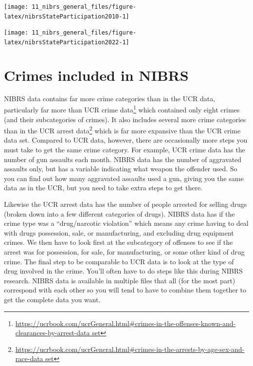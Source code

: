 \documentclass[
]{krantz}
\let\origfigure\figure
\let\endorigfigure\endfigure
\renewenvironment{figure}[1][2] {
    \expandafter\origfigure\expandafter[H]
} {
    \endorigfigure
}
\renewcommand{\href}[2]{#2\footnote{\url{#1}}}
\begin{document}
\begin{figure}

{\centering \texttt{[image: 11\_nibrs\_general\_files/figure-latex/nibrsStateParticipation2010-1]} 

}

\caption{The percent of each state's population that is covered by police agencies reporting at least one month of data to NIBRS, 2010}\label{fig:nibrsStateParticipation2010}
\end{figure}

\begin{figure}

{\centering \texttt{[image: 11\_nibrs\_general\_files/figure-latex/nibrsStateParticipation2022-1]} 

}

\caption{The percent of each state's population that is covered by police agencies reporting at least one month of data to NIBRS, 2023 (using 2022 ACS 5-year Census data)}\label{fig:nibrsStateParticipation2022}
\end{figure}

\section{Crimes included in
NIBRS}\label{crimes-included-in-nibrs}

NIBRS data contains far more crime categories than in the
UCR data, particularly far more than
\href{https://ucrbook.com/ucrGeneral.html\#crimes-in-the-offenses-known-and-clearances-by-arrest-data set}{UCR
crime data} which contained only eight crimes (and their
subcategories of crimes). It also includes several more
crime categories than in the
\href{https://ucrbook.com/ucrGeneral.html\#crimes-in-the-arrests-by-age-sex-and-race-data set}{UCR
arrest data} which is far more expansive than the UCR crime
data set. Compared to UCR data, however, there are
occasionally more steps you must take to get the same crime
category. For example, UCR crime data has the number of gun
assaults each month. NIBRS data has the number of aggravated
assaults only, but has a variable indicating what weapon the
offender used. So you can find out how many aggravated
assaults used a gun, giving you the same data as in the UCR,
but you need to take extra steps to get there.

Likewise the UCR arrest data has the number of people
arrested for selling drugs (broken down into a few different
categories of drugs). NIBRS data has if the crime type was a
``drug/narcotic violation'' which means any crime having to
deal with drugs possession, sale, or manufacturing, and
excluding drug equipment crimes. We then have to look first
at the subcategory of offenses to see if the arrest was for
possession, for sale, for manufacturing, or some other kind
of drug crime. The final step to be comparable to UCR data
is to look at the type of drug involved in the crime. You'll
often have to do steps like this during NIBRS research.
NIBRS data is available in multiple files that all (for the
most part) correspond with each other so you will tend to
have to combine them together to get the complete data you
want.
\end{document}
